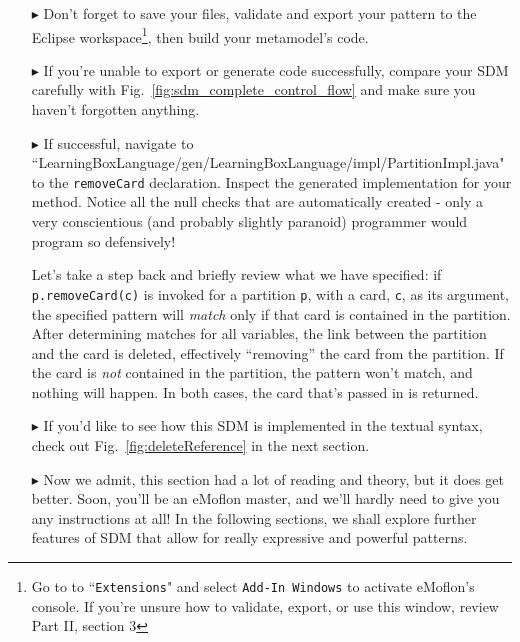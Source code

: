 \begin{itemize}
\item[$\blacktriangleright$]  Don't forget to save your files, validate and export your pattern to the Eclipse workspace\footnote{Go to to
``\texttt{Extensions}" and select \texttt{Add-In Windows} to activate eMoflon's console. If you're unsure how to validate, export, or use this window, review
Part II, section 3}, then build your metamodel's code.

\item[$\blacktriangleright$] If you're unable to export or generate code successfully, compare your SDM carefully with Fig.~\ref{fig:sdm_complete_control_flow}
and make sure you haven't forgotten anything.

\item[$\blacktriangleright$] If successful, navigate to ``Learning\-Box\-Language/\-gen/\-Learning\-Box\-Language/\-impl/\-Partition\-Impl.java" to the
\texttt{\-remove\-Card} declaration. Inspect the generated implementation for your method. Notice all the null checks that are automatically created - only a
very conscientious (and probably slightly paranoid) programmer would program so defensively!

Let's take a step back and briefly review what we have specified:  if \texttt{p.remove\-Card(c)} is invoked for a partition \texttt{p}, with a card, \texttt{c},
as its argument, the specified pattern will \emph{match} only if that card is contained in the partition. After determining matches for all variables, the
link between the partition and the card is deleted, effectively ``removing'' the card from the partition. If the card is \emph{not} contained in the partition,
the pattern won't match, and nothing will happen. In both cases, the card that's passed in is returned.

\item[$\blacktriangleright$] If you'd like to see how this SDM is implemented in the textual syntax, check out Fig.~\ref{fig:deleteReference} in the next
section.

\item[$\blacktriangleright$] Now we admit, this section had a lot of reading and theory, but it does get better. Soon, you'll be an eMoflon master, and we'll
hardly need to give you any instructions at all! In the following sections, we shall explore further features of SDM that allow for really expressive and
powerful patterns.


\end{itemize}

